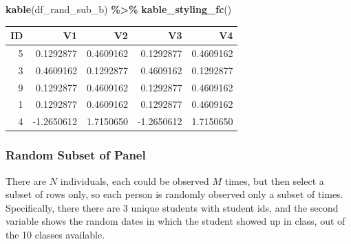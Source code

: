 \documentclass[
]{book}
\newenvironment{Shaded}{\begin{snugshade}}{\end{snugshade}}
\newcommand{\KeywordTok}[1]{\textcolor[rgb]{0.13,0.29,0.53}{\textbf{#1}}}
\newcommand{\NormalTok}[1]{#1}
\newcommand{\OperatorTok}[1]{\textcolor[rgb]{0.81,0.36,0.00}{\textbf{#1}}}
\newcommand{\StringTok}[1]{\textcolor[rgb]{0.31,0.60,0.02}{#1}}
\begin{document}
\begin{Shaded}
\begin{Highlighting}[]
\KeywordTok{kable}\NormalTok{(df\_rand\_sub\_b) }\OperatorTok{\%\textgreater{}\%}\StringTok{ }\KeywordTok{kable\_styling\_fc}\NormalTok{()}
\end{Highlighting}
\end{Shaded}

\begin{table}[!h]
\centering
\begin{tabular}{r|r|r|r|r}
\hline
ID & V1 & V2 & V3 & V4\\
\hline
\rowcolor{gray!6}  5 & 0.1292877 & 0.4609162 & 0.1292877 & 0.4609162\\
\hline
3 & 0.4609162 & 0.1292877 & 0.4609162 & 0.1292877\\
\hline
\rowcolor{gray!6}  9 & 0.1292877 & 0.4609162 & 0.1292877 & 0.4609162\\
\hline
1 & 0.1292877 & 0.4609162 & 0.1292877 & 0.4609162\\
\hline
\rowcolor{gray!6}  4 & -1.2650612 & 1.7150650 & -1.2650612 & 1.7150650\\
\hline
\end{tabular}
\end{table}

\hypertarget{random-subset-of-panel}{%
\subsubsection{Random Subset of Panel}\label{random-subset-of-panel}}

There are \(N\) individuals, each could be observed \(M\) times, but then select a subset of rows only, so each person is randomly observed only a subset of times. Specifically, there there are 3 unique students with student ids, and the second variable shows the random dates in which the student showed up in class, out of the 10 classes available.
\end{document}
